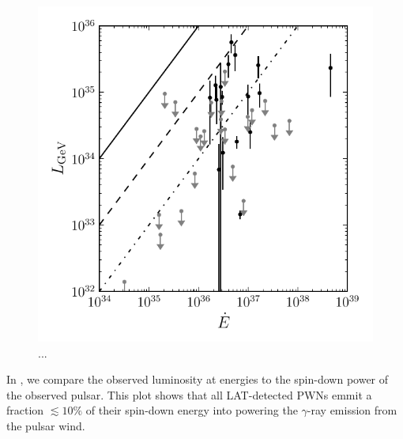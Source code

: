 \begin{figure}[htbp]
  \centering
  \includegraphics{chapters/population_study/figures/pwn_luminosity_vs_edot.pdf}
  \caption{...}
\end{figure}

In , we compare the observed luminosity at
\gev energies to the spin-down power of the observed pulsar.  This plot
shows that all \ac{LAT}-detected \acp{PWN} emmit a fraction $\lesssim
10\%$ of their spin-down energy into powering the $\gamma$-ray emission
from the pulsar wind.



